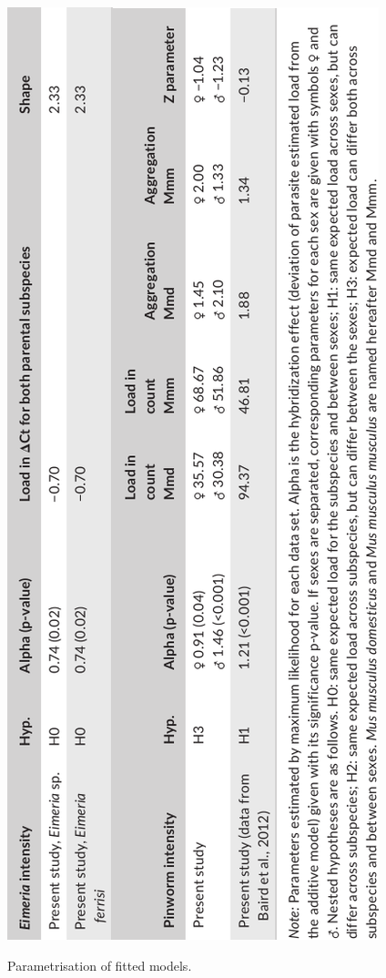 \begin{table}[H]
	\centering
	\includegraphics[width=\linewidth,height=\textheight,keepaspectratio]{images/2article1/Table1.pdf}
	\caption{Parametrisation of fitted models.}
\end{table}

